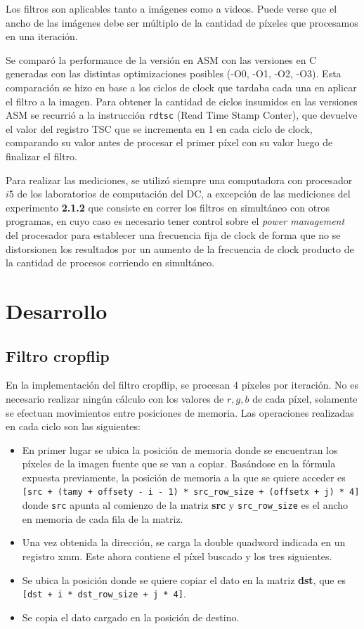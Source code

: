 \documentclass[a4paper]{article}
\begin{document}
Los filtros son aplicables tanto a imágenes como a videos. Puede verse que el ancho de las imágenes debe ser múltiplo de la cantidad de píxeles que procesamos en una iteración. %

Se comparó la performance de la versión en ASM con las versiones en C generadas con las distintas optimizaciones posibles (-O0, -O1, -O2, -O3). Esta comparación se hizo en base a los ciclos de clock que tardaba cada una en aplicar el filtro a la imagen. Para obtener la cantidad de ciclos insumidos en las versiones ASM se recurrió a la instrucción \texttt{rdtsc} (Read Time Stamp Conter), que devuelve el valor del registro TSC que se incrementa en 1 en cada ciclo de clock, comparando su valor antes de procesar el primer píxel con su valor luego de finalizar el filtro. 

Para realizar las mediciones, se utilizó siempre una computadora con procesador $i5$ de los laboratorios de computación del DC, a excepción de las mediciones del experimento \textbf{2.1.2} que consiste en correr los filtros en simultáneo con otros programas, en cuyo caso es necesario tener control sobre el \textit{power management} del procesador para establecer una frecuencia fija de clock de forma que no se distorsionen los resultados por un aumento de la frecuencia de clock producto de la cantidad de procesos corriendo en simultáneo.

\section{Desarrollo}

\subsection{Filtro cropflip}
En la implementación del filtro cropflip, se procesan 4 píxeles por iteración. No es necesario realizar ningún cálculo con los valores de $r,g,b$ de cada píxel, solamente se efectuan movimientos entre posiciones de memoria. Las operaciones realizadas en cada ciclo son las siguientes:
\begin{itemize}
\item En primer lugar se ubica la posición de memoria donde se encuentran los píxeles de la imagen fuente que se van a copiar. Basándose en la fórmula expuesta previamente, la posición de memoria a la que se quiere acceder es \texttt{[src + (tamy + offsety - i - 1) * src_row_size + (offsetx + j) * 4]} donde \texttt{src} apunta al comienzo de la matriz \textbf{src} y \texttt{src_row_size} es el ancho en memoria de cada fila de la matriz.
\item Una vez obtenida la dirección, se carga la double quadword indicada en un registro xmm. Este ahora contiene el píxel buscado y los tres siguientes.
\item Se ubica la posición donde se quiere copiar el dato en la matriz \textbf{dst}, que es \texttt{[dst + i * dst_row_size + j * 4]}.
\item Se copia el dato cargado en la posición de destino.
\end{itemize}
\end{document}

